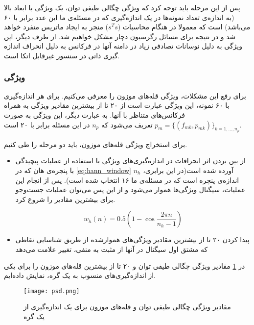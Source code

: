  پس از این مرحله باید توجه کرد که ویژگی چگالی طیفی توان، یک ویژگی با ابعاد بالا (به اندازه‌ی تعداد نمونه‌ها در یک اندازه‌گیری که در مسئله‌ی ما این عدد برابر با ۶۰ می‌باشد) است که معمولا در هنگام محاسبات ($s^Ts$) منجر به ایجاد ماتریس منفرد خواهد شد و در نتیجه برای مسائل رگرسیون دچار مشکل خواهیم شد. از طرف دیگر، این ویژگی به دلیل نوسانات تصادفی زیاد در دامنه آنها در فرکانس به دلیل انحراف اندازه گیری ذاتی در سنسور  غیرقابل اتکا است.
 
\subsubsection{ویژگی }

برای رفع این مشکلات، ویژگی قله‌های موزون را معرفی می‌کنیم. برای هر اندازه‌گیری با ۶۰ نمونه، این ویژگی عبارت است از ۲۰ تا از بیشترین مقادیر ویژگی  به همراه فرکانس‌های متناظر با آنها. به عبارت دیگر، این ویژگی به صورت $p_m = \{(f_{mk}, p_{mk})\}_{k=1, ..., n_p}$ تعریف می‌شود که $n_p$ در این مسئله برابر با ۲۰ است.

برای استخراج ویژگی قله‌های موزون، باید دو مرحله را طی کنیم.
\begin{itemize}
\item از بین بردن اثر انحرافات در اندازه‌گیری‌های ویژگی‌  با استفاده از عملیات پیچیدگی با پنجره‌ی هان که در \cref{eq:hann_window} آورده شده است(در این برابری، $n_h$ اندازه‌ی پنچره است که در مسئله‌ی ما ۱۶ انتخاب شده است). پس از انجام این عملیات، سیگنال ویژگی‌ها هموار می‌شود و از این پس می‌توان عملیات جست‌وجو برای بیشترین مقادیر را شروع کرد.

\begin{equation}
\label{eq:hann_window}
w_h(n) = 0.5 (1 - \cos{\dfrac{2\pi n}{n_h - 1}})
\end{equation}

\item پیدا کردن ۲۰ تا از بیشترین مقادیر ویژگی‌های هموارشده از طریق شناسایی نقاطی که مشتق اول سیگنال در آنها از مثبت به منفی، تغییر علامت می‌دهد

\end{itemize}

در \cref{fig:psd} مقادیر ویژگی چگالی طیفی توان و ۲۰ تا از بیشترین قله‌های موزون را برای یکی از اندازه‌گیری‌های منسوب به یک گره، نمایش داده‌ایم.

\begin{figure}[!h]
\centerline{\texttt{[image: psd.png]}}
\caption{مقادیر ویژگی چگالی طیفی توان و قله‌های موزون برای یک اندازه‌گیری از یک گره}
\label{fig:psd}
\end{figure}

